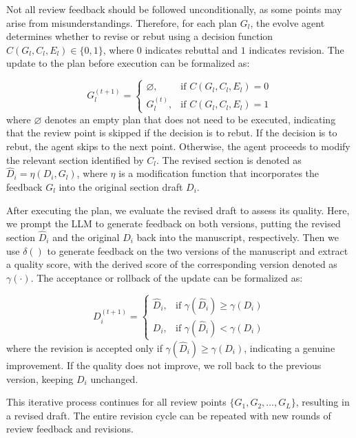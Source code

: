 \documentclass[manuscript,review,anonymous]{acmart}
\begin{document}
Not all review feedback should be followed unconditionally, as some points may arise from misunderstandings. Therefore, for each plan $G_l$, the evolve agent determines whether to revise or rebut using a decision function $C(G_l, C_l, E_l) \in \{0, 1\}$, where $0$ indicates rebuttal and $1$ indicates revision. The update to the plan before execution can be formalized as:

\begin{equation}
  G_l^{(t+1)} =
  \begin{cases}
    \varnothing, & \text{if } C(G_l, C_l, E_l) = 0 \\
    G_l^{(t)}, & \text{if } C(G_l, C_l, E_l) = 1
  \end{cases}
\end{equation}
where $\varnothing$ denotes an empty plan that does not need to be executed, indicating that the review point is skipped if the decision is to rebut. If the decision is to rebut, the agent skips to the next point. Otherwise, the agent proceeds to modify the relevant section identified by $C_l$. The revised section is denoted as $\hat{D}_i = \eta(D_i, G_l)$, where $\eta$ is a modification function that incorporates the feedback $G_l$ into the original section draft $D_i$.

After executing the plan, we evaluate the revised draft to assess its quality. Here, we prompt the LLM to generate feedback on both versions, putting the revised section $\hat{D}_i$ and the original $D_i$ back into the manuscript, respectively. Then we use $\delta()$ to generate feedback on the two versions of the manuscript and extract a quality score, with the derived score of the corresponding version denoted as $\gamma(\cdot)$. The acceptance or rollback of the update can be formalized as:

\begin{equation}
  D_i^{(t+1)} =
  \begin{cases}
      \hat{D}_i, & \text{if } \gamma(\hat{D}_i) \geq \gamma(D_i) \\
      D_i, & \text{if } \gamma(\hat{D}_i) < \gamma(D_i)
  \end{cases}
\end{equation}
where the revision is accepted only if $\gamma(\hat{D}_i) \geq \gamma(D_i)$, indicating a genuine improvement. If the quality does not improve, we roll back to the previous version, keeping $D_i$ unchanged.

This iterative process continues for all review points $\{G_1, G_2, \ldots, G_L\}$, resulting in a revised draft. The entire revision cycle can be repeated with new rounds of review feedback and revisions.
\end{document}
